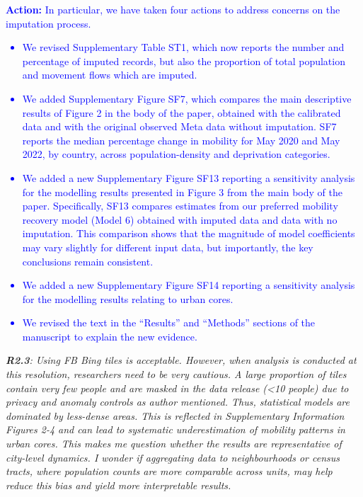 \documentclass[12pt,a4paper,oneside, reqno]{amsart}
\begin{document}
\textcolor{blue}{\textbf{Action:} In particular, we have taken four actions to address concerns on the imputation process.
\begin{itemize}[noitemsep, topsep=0pt]
\item We revised Supplementary Table ST1, which now reports the number and percentage of imputed records, but also the proportion of total population and movement flows which are imputed.
\item We added Supplementary Figure SF7, which compares the main descriptive results of Figure 2 in the body of the paper, obtained with the calibrated data and with the original observed Meta data without imputation. SF7 reports the median percentage change in mobility for May 2020 and May 2022, by country, across population-density and deprivation categories. 
\item We added a new Supplementary Figure SF13 reporting a sensitivity analysis for the modelling results presented in Figure 3 from the main body of the paper. Specifically, SF13 compares estimates from our preferred mobility recovery model (Model 6) obtained with imputed data and data with no imputation. This comparison shows that the magnitude of model coefficients may vary slightly for different input data, but importantly, the key conclusions remain consistent.
\item We added a new Supplementary Figure SF14 reporting a sensitivity analysis for the modelling results relating to urban cores.
\item We revised the text in the ``Results'' and ``Methods'' sections of the manuscript to explain the new evidence.
\end{itemize}}

\setlength{\leftskip}{0cm} \textit{\textbf{R2.3}: Using FB Bing tiles is acceptable. However, when analysis is conducted at this resolution, researchers need to be very cautious. A large proportion of tiles contain very few people and are masked in the data release (<10 people) due to privacy and anomaly controls as author mentioned. Thus, statistical models are dominated by less-dense areas. This is reflected in Supplementary Information Figures 2-4 and can lead to systematic underestimation of mobility patterns in urban cores. This makes me question whether the results are representative of city-level dynamics. I wonder if aggregating data to neighbourhoods or census tracts, where population counts are more comparable across units, may help reduce this bias and yield more interpretable results.}
\end{document}
